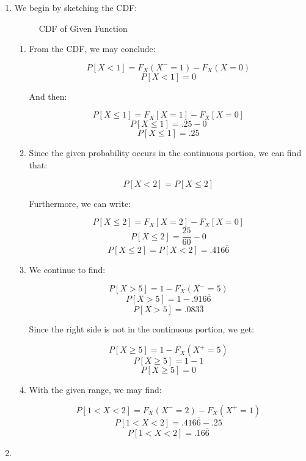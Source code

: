 \begin{enumerate}

  \item We begin by sketching the CDF:

    \begin{figure}[H]
      \centering
      
      \caption{CDF of Given Function}
      \label{fig:1}
    \end{figure}

    \begin{enumerate}

      \item From the CDF, we may conclude:

        $$P[X<1]=F_X(X^-=1)-F_X(X=0)$$
        $$\boxed{P[X<1]=0}$$

        And then:

        $$P[X\leq 1]=F_X[X=1]-F_X[X=0]$$
        $$P[X\leq 1]=.25-0$$
        $$\boxed{P[X\leq 1]=.25}$$

      \item Since the given probability occurs in the continuous portion, we can find that:

        $$P[X<2]=P[X\leq 2]$$

        Furthermore, we can write:

        $$P[X\leq 2]=F_X[X=2]-F_X[X=0]$$
        $$P[X\leq 2]=\frac{25}{60}-0$$
        $$\boxed{P[X\leq 2]=P[X<2]=.416\bar{6}}$$

      \item We continue to find:

        $$P[X>5]=1-F_X(X^-=5)$$
        $$P[X>5]=1-.916\bar{6}$$
        $$\boxed{P[X>5]=.083\bar{3}}$$

        Since the right side is not in the continuous portion, we get:

        $$P[X\geq5]=1-F_X(X^+=5)$$
        $$P[X\geq5]=1-1$$
        $$\boxed{P[X\geq5]=0}$$

      \item With the given range, we may find:

        $$P[1<X<2]=F_X(X^-=2)-F_X(X^+=1)$$
        $$P[1<X<2]=.416\bar{6}-.25$$
        $$\boxed{P[1<X<2]=.16\bar{6}}$$

    \end{enumerate}

  \item

    \begin{enumerate}


\end{enumerate}
\end{enumerate}
